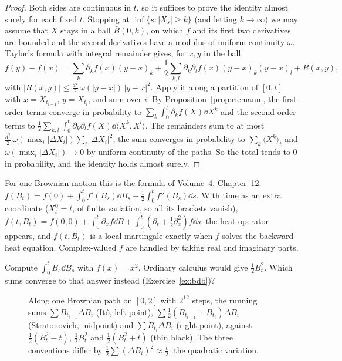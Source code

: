 \begin{proof}
Both sides are continuous in $t$, so it suffices to prove the identity almost surely for each fixed $t$. Stopping at $\inf\{s:|X_s|\ge k\}$ (and letting $k\to\infty$) we may assume that $X$ stays in a ball $\bar B(0,k)$, on
which $f$ and its first two derivatives are bounded and the second derivatives have a modulus of uniform continuity $\omega$. Taylor's formula with integral remainder gives, for $x,y$ in the ball,
\[
f(y)-f(x)=\sum_k\partial_kf(x)(y-x)_k+\frac12\sum_{k,l}\partial_k\partial_lf(x)(y-x)_k(y-x)_l+R(x,y),
\]
with $|R(x,y)|\le\frac{d^2}2\,\omega(|y-x|)\,|y-x|^2$.
Apply it along a partition of $[0,t]$ with $x=X_{t_{i-1}}$, $y=X_{t_i}$, and sum over $i$. By Proposition~\ref{prop:riemann}, the first-order terms converge in probability to $\sum_k\int_0^t\partial_kf(X)\dd X^k$ and the
second-order terms to $\frac12\sum_{k,l}\int_0^t\partial_k\partial_lf(X)\dd\langle X^k,X^l\rangle$. The remainders sum to at most $\frac{d^2}2\,\omega(\max_i|\Delta X_i|)\sum_i|\Delta X_i|^2$; the sum converges in probability to
$\sum_k\langle X^k\rangle_t$ and $\omega(\max_i|\Delta X_i|)\to0$ by uniform continuity of the paths. So the total tends to $0$ in probability, and the identity holds almost surely.
\end{proof}

For one Brownian motion this is the formula of Volume~4, Chapter~12: $f(B_t)=f(0)+\int_0^tf'(B_s)\dd B_s+\frac12\int_0^tf''(B_s)\dd s$. With time as an extra coordinate ($X^0_t=t$, of finite variation, so all its
brackets vanish), $f(t,B_t)=f(0,0)+\int_0^t\partial_xf\dd B+\int_0^t(\partial_t+\frac12\partial_x^2)f\dd s$: the heat operator appears, and $f(t,B_t)$ is a local martingale exactly when $f$ solves the backward heat equation.
Complex-valued $f$ are handled by taking real and imaginary parts.

\begin{think}
Compute $\int_0^tB_s\dd B_s$ with $f(x)=x^2$. Ordinary calculus would give $\frac12B_t^2$. Which sums converge to that answer instead (Exercise~\ref{ex:bdb})?
\end{think}

\begin{figure}[ht]
\centering
{}
\caption{Along one Brownian path on $[0,2]$ with $2^{12}$ steps, the running sums $\sum B_{t_{i-1}}\Delta B_i$ (It\^o, left point), $\sum\frac12(B_{t_{i-1}}+B_{t_i})\Delta B_i$ (Stratonovich, midpoint) and $\sum B_{t_i}\Delta B_i$
(right point), against $\frac12(B_t^2-t)$, $\frac12B_t^2$ and $\frac12(B_t^2+t)$ (thin black). The three conventions differ by $\frac12\sum(\Delta B_i)^2\approx\frac t2$: the quadratic variation.}
\label{fig:sums}
\end{figure}

